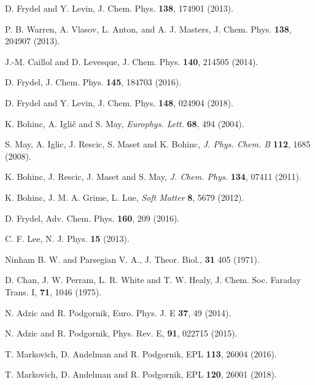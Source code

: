 \documentclass[pre,twocolumn,graphicx]{revtex4-1}
\begin{document}
\begin{thebibliography}{99}
D. Frydel and Y. Levin, J. Chem. Phys. {\bf 138}, 174901 (2013).  

P. B. Warren, A. Vlasov, L. Anton, and A. J. Masters, J. Chem. Phys. {\bf 138}, 204907 (2013).  

J.-M. Caillol and D. Levesque, J. Chem. Phys. {\bf 140},  214505 (2014).  

D. Frydel, J. Chem. Phys. {\bf 145}, 184703 (2016).

D. Frydel and Y. Levin, J. Chem. Phys. {\bf 148}, 024904 (2018).




K. Bohinc, A. Igli\v c and S. May, {\sl Europhys. Lett.} {\bf 68}, 494 (2004).

S. May, A. Iglic, J. Rescic, S. Maset and K. Bohinc, {\sl J. Phys. Chem. B} {\bf 112}, 1685 (2008).

K. Bohinc, J. Rescic, J. Maset and S. May, {\sl J. Chem. Phys. } {\bf 134}, 07411 (2011).

K. Bohinc, J. M. A. Grime, L. Lue, {\sl Soft Matter} {\bf 8}, 5679 (2012).





D. Frydel,  Adv. Chem. Phys.  {\bf 160}, 209 (2016).



C. F. Lee, N. J. Phys. {\bf 15} (2013).






Ninham B. W. and Parsegian V. A., J. Theor. Biol., {\bf 31} 405 (1971).

D. Chan, J. W. Perram, L. R. White and T. W. Healy, J. Chem. Soc. Faraday Trans. I, {\bf 71}, 1046 (1975).



N. Adzic and R. Podgornik, Euro. Phys. J. E {\bf 37}, 49 (2014).

N. Adzic and R. Podgornik, Phys. Rev. E, {\bf 91}, 022715 (2015).

T. Markovich, D. Andelman and R. Podgornik, EPL {\bf 113}, 26004 (2016).

T. Markovich, D. Andelman and R. Podgornik, EPL {\bf 120}, 26001 (2018).



\end{thebibliography}
\end{document}
